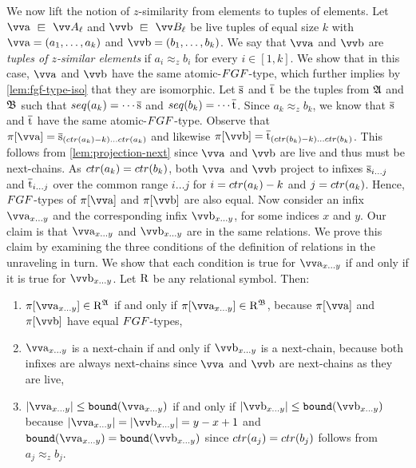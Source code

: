 We now lift the notion of $z$-similarity from elements to tuples of elements.
Let $\elemtuptuplea \sqin \unraveldom{A}_{\ell}$ and $\elemtuptupleb \sqin \unraveldom{B}_{\ell}$ be live tuples of equal size $k$ with $\elemtuptuplea = (a_{1}, \ldots, a_{k})$ and $\elemtuptupleb = (b_{1}, \ldots, b_{k})$.
We say that $\elemtuptuplea$ and $\elemtuptupleb$ are \emph{tuples of $z$-similar elements} if $a_{i} \approx_{z} b_{i}$ for every $i \in [1,k]$.
We show that in this case, $\elemtuptuplea$ and $\elemtuptupleb$ have the same atomic-$\FGF$-type, which further implies by \cref{lem:fgf-type-iso} that they are isomorphic.
Let $\overline{\mathrm{s}}$ and $\overline{\mathrm{t}}$ be the tuples from ${\mathfrak{A}}$ and ${\mathfrak{B}}$ such that $\seq{a_{k}} = \cdots \elemtuples$ and $\seq{b_{k}} = \cdots \elemtuplet$.
Since $a_{k} \approx_z b_{k}$, we know that $\overline{\mathrm{s}}$ and $\overline{\mathrm{t}}$ have the same atomic-$\FGF$-type.
Observe that $\pi[\elemtuptuplea] = \elemtuples_{(\ctr{a_{k}}-k)\ldots{}\ctr{a_{k}}}$ and likewise $\pi[\elemtuptupleb] = \elemtuplet_{(\ctr{b_{k}}-k)\ldots{}\ctr{b_{k}}}$.
This follows from \cref{lem:projection-next} since $\elemtuptuplea$ and $\elemtuptupleb$ are live and thus must be next-chains.
As $\ctr{a_{k}} = \ctr{b_{k}}$, both $\elemtuptuplea$ and $\elemtuptupleb$ project to infixes $\overline{\mathrm{s}}_{i\ldots{}j}$ and $\overline{\mathrm{t}}_{i\ldots{}j}$ over the common range $i\ldots{}j$ for $i = \ctr{a_{k}} - k$ and $j = \ctr{a_{k}}$.
Hence, $\FGF$-types of $\pi[\elemtuptuplea]$ and $\pi[\elemtuptupleb]$ are also equal.
Now consider an infix $\elemtuptuplea_{x\ldots{}y}$ and the corresponding infix $\elemtuptupleb_{x\ldots{}y}$, for some indices $x$ and $y$.
Our claim is that $\elemtuptuplea_{x\ldots{}y}$ and $\elemtuptupleb_{x\ldots{}y}$ are in the same relations.
We prove this claim by examining the three conditions of the definition of relations in the unraveling in turn.
We show that each condition is true for $\elemtuptuplea_{x\ldots{}y}$ if and only if it is true for $\elemtuptupleb_{x\ldots{}y}$.
Let $\mathrm{R}$ be any relational symbol. Then:
\begin{enumerate}
  \item $\pi[\elemtuptuplea_{x\ldots{}y}] \in \relR^{\str{A}}$ if and only if $\pi[\elemtuptuplea_{x\ldots{}y}] \in \relR^{\str{B}}$, because $\pi[\elemtuptuplea]$ and $\pi[\elemtuptupleb]$ have equal $\FGF$-types,
  \item $\elemtuptuplea_{x\ldots{}y}$ is a next-chain if and only if $\elemtuptupleb_{x\ldots{}y}$ is a next-chain, because both infixes are always next-chains since $\elemtuptuplea$ and $\elemtuptupleb$ are next-chains as they are live,
  \item $|\elemtuptuplea_{x\ldots{}y}| \le \mathtt{bound}(\elemtuptuplea_{x\ldots{}y})$ if and only if $|\elemtuptupleb_{x\ldots{}y}| \le \mathtt{bound}(\elemtuptupleb_{x\ldots{}y})$ because $|\elemtuptuplea_{x\ldots{}y}| = |\elemtuptupleb_{x\ldots{}y}| = y-x+1$ and $\mathtt{bound}(\elemtuptuplea_{x\ldots{}y}) = \mathtt{bound}(\elemtuptupleb_{x\ldots{}y})$ since $\ctr{a_{j}} = \ctr{b_{j}}$ follows from $a_{j} \approx_{z} b_{j}$.
\end{enumerate}
